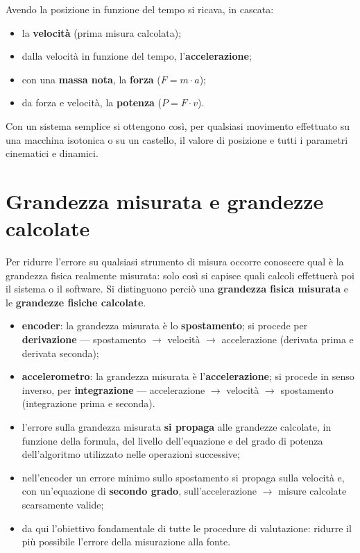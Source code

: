 Avendo la posizione in funzione del tempo si ricava, in cascata:
\begin{itemize}
  \item la \textbf{velocità} (prima misura calcolata);
  \item dalla velocità in funzione del tempo, l'\textbf{accelerazione};
  \item con una \textbf{massa nota}, la \textbf{forza} ($F = m \cdot a$);
  \item da forza e velocità, la \textbf{potenza} ($P = F \cdot v$).
\end{itemize}

Con un sistema semplice si ottengono così, per qualsiasi movimento effettuato su una macchina
isotonica o su un castello, il valore di posizione e tutti i parametri cinematici e dinamici.

\section{Grandezza misurata e grandezze calcolate}

Per ridurre l'errore su qualsiasi strumento di misura occorre conoscere qual è la grandezza fisica
realmente misurata: solo così si capisce quali calcoli effettuerà poi il sistema o il software. Si
distinguono perciò una \textbf{grandezza fisica misurata} e le \textbf{grandezze fisiche
calcolate}.

\begin{itemize}
  \item \textbf{encoder}: la grandezza misurata è lo \textbf{spostamento}; si procede per
    \textbf{derivazione} --- spostamento $\rightarrow$ velocità $\rightarrow$ accelerazione
    (derivata prima e derivata seconda);
  \item \textbf{accelerometro}: la grandezza misurata è l'\textbf{accelerazione}; si procede in
    senso inverso, per \textbf{integrazione} --- accelerazione $\rightarrow$ velocità
    $\rightarrow$ spostamento (integrazione prima e seconda).
\end{itemize}

\begin{itemize}
  \item l'errore sulla grandezza misurata \textbf{si propaga} alle grandezze calcolate, in funzione
    della formula, del livello dell'equazione e del grado di potenza dell'algoritmo utilizzato
    nelle operazioni successive;
  \item nell'encoder un errore minimo sullo spostamento si propaga sulla velocità e, con
    un'equazione di \textbf{secondo grado}, sull'accelerazione $\rightarrow$ misure calcolate
    scarsamente valide;
  \item da qui l'obiettivo fondamentale di tutte le procedure di valutazione: ridurre il più
    possibile l'errore della misurazione alla fonte.
\end{itemize}
